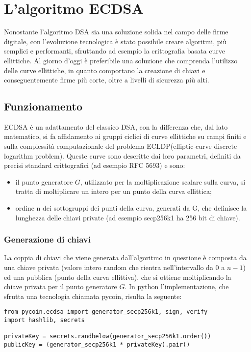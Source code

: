 \chapter{L'algoritmo ECDSA}

Nonostante l'algoritmo DSA sia una soluzione solida nel campo delle firme digitale, con l'evoluzione tecnologica è stato possibile creare algoritmi, più semplici e performanti, sfruttando  ad esempio la crittografia basata curve ellittiche. Al giorno d'oggi è preferibile una soluzione che comprenda l'utilizzo delle curve ellittiche, in quanto comportano la creazione di chiavi e conseguentemente firme più corte, oltre a livelli di sicurezza più alti.

\section{Funzionamento}

ECDSA è un adattamento del classico DSA, con la differenza che, dal lato matematico, si fa affidamento ai gruppi ciclici di curve ellittiche su campi finiti e sulla complessità computazionale del problema ECLDP(elliptic-curve discrete logarithm problem). Queste curve sono descritte dai loro parametri, definiti da precisi standard crittografici (ad esempio RFC 5693) e sono:
\begin{itemize}
	\item il punto generatore $G$, utilizzato per la moltiplicazione scalare sulla curva, si tratta di moltiplicare un intero per un punto della curva ellittica;
	\item ordine n dei sottogruppi dei punti della curva, generati da G, che definisce la lunghezza delle chiavi private (ad esempio secp256k1 ha 256 bit di chiave).
\end{itemize}

\subsection{Generazione di chiavi}

La coppia di chiavi che viene generata dall'algoritmo in questione è composta da una chiave privata (valore intero random che rientra nell'intervallo da $0$ a $n-1$) ed una pubblica (punto della curva ellittiva), che si ottiene moltiplicando la chiave privata per il punto generatore $G$. 
In python l'implementazione, che sfrutta una tecnologia chiamata pycoin, risulta la seguente:


\begin{lstlisting}
from pycoin.ecdsa import generator_secp256k1, sign, verify
import hashlib, secrets

privateKey = secrets.randbelow(generator_secp256k1.order())
publicKey = (generator_secp256k1 * privateKey).pair()	

\end{lstlisting}

